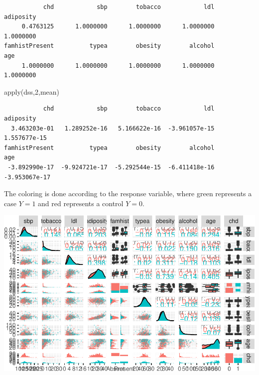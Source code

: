 \documentclass[
  letterpaper,
  DIV=11,
  numbers=noendperiod]{scrartcl}
\newenvironment{Shaded}{\begin{snugshade}}{\end{snugshade}}
\newcommand{\DecValTok}[1]{\textcolor[rgb]{0.68,0.00,0.00}{#1}}
\newcommand{\FunctionTok}[1]{\textcolor[rgb]{0.28,0.35,0.67}{#1}}
\newcommand{\NormalTok}[1]{\textcolor[rgb]{0.00,0.23,0.31}{#1}}
\begin{document}
\begin{verbatim}
           chd            sbp        tobacco            ldl      adiposity 
     0.4763125      1.0000000      1.0000000      1.0000000      1.0000000 
famhistPresent          typea        obesity        alcohol            age 
     1.0000000      1.0000000      1.0000000      1.0000000      1.0000000 
\end{verbatim}

\begin{Shaded}
\begin{Highlighting}[]
\FunctionTok{apply}\NormalTok{(dss,}\DecValTok{2}\NormalTok{,mean)}
\end{Highlighting}
\end{Shaded}

\begin{verbatim}
           chd            sbp        tobacco            ldl      adiposity 
  3.463203e-01   1.289252e-16   5.166622e-16  -3.961057e-15   1.557677e-15 
famhistPresent          typea        obesity        alcohol            age 
 -3.892990e-17  -9.924721e-17  -5.292544e-15  -6.411418e-16  -3.953067e-17 
\end{verbatim}

The coloring is done according to the response variable, where green
represents a case \(Y=1\) and red represents a control \(Y=0\).

\includegraphics{L10_files/figure-pdf/unnamed-chunk-6-1.pdf}
\end{document}
